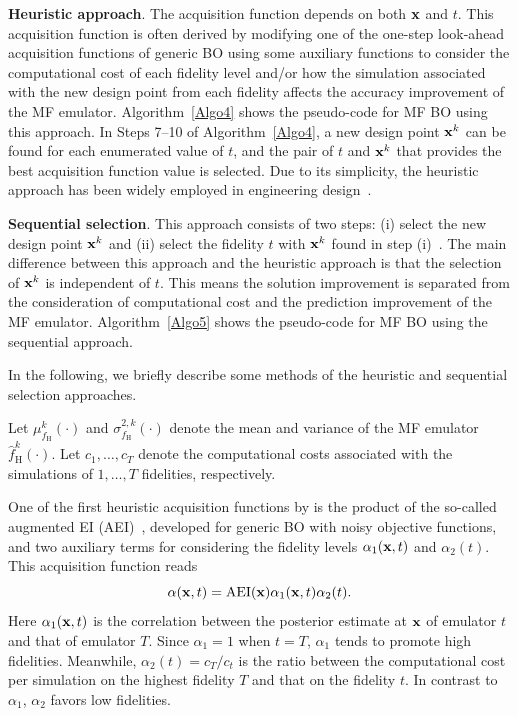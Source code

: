 \documentclass[iicol,sn-basic]{sn-jnl}%
\theoremstyle{thmstyleone}%
\theoremstyle{thmstyletwo}
\theoremstyle{thmstylethree}
\begin{document}
\begin{linenumbers}
\textbf{Heuristic approach}.
The acquisition function depends on both $\bf x$ and $t$.
This acquisition function is often derived by modifying one of the one-step look-ahead acquisition functions of generic BO using some auxiliary functions to consider the computational cost of each fidelity level and/or how the simulation associated with the new design point from each fidelity affects the accuracy improvement of the MF emulator.
Algorithm~\ref{Algo4} shows the pseudo-code for MF BO using this approach.
In Steps 7--10 of Algorithm~\ref{Algo4}, a new design point ${\bf x}^k$ can be found for each enumerated value of $t$, and the pair of $t$ and ${\bf x}^k$ that provides the best acquisition function value is selected.
Due to its simplicity, the heuristic approach has been widely employed in engineering design~\citep{Huang2006,Poloczek2017,YZhang2018,Ghoreishi2019,Ruan2020,Shu2021,Fiore2021,Sacher2021,He2021,Huang2023,Ribeiro2023,Winter2023,Foumani2023,Grassi2023,Fiore2023}.

\textbf{Sequential selection}.
This approach consists of two steps: (i) select the new design point ${\bf x}^k$ and (ii) select the fidelity $t$ with ${\bf x}^k$ found in step (i)~\citep{Chen2016,Kandasamy2017,Meliani2019,Tran2020a,Tran2020b,Kandasamy2019}.
The main difference between this approach and the heuristic approach is that the selection of ${\bf x}^k$ is independent of $t$.
This means the solution improvement is separated from the consideration of computational cost and the prediction improvement of the MF emulator.
Algorithm~\ref{Algo5} shows the pseudo-code for MF BO using the sequential approach. 

In the following, we briefly describe some methods of the heuristic and sequential selection approaches.

Let $\mu^k_{f_\text{H}}(\cdot)$ and $\sigma_{f_\text{H}}^{2,k}(\cdot)$ denote the mean and variance of the MF emulator $\hat{f}_\text{H}^k(\cdot)$.
Let $c_1,\dots,c_T$ denote the computational costs associated with the simulations of $1,\dots,T$ fidelities, respectively.

One of the first heuristic acquisition functions by \cite{Huang2006} is the product of the so-called augmented EI (AEI)~\citep{Huang2006a}, developed for generic BO with noisy objective functions, and two auxiliary terms for considering the fidelity levels $\alpha_1({\bf x},t)$ and $\alpha_2(t)$.
This acquisition function reads
\begin{equation}
		\alpha({\bf x},t) = \text{AEI}({\bf x}) \alpha_1({\bf x},t) \alpha_2(t).
\end{equation}
Here $\alpha_1({\bf x},t)$ is the correlation between the posterior estimate at $\bf x$ of emulator $t$ and that of emulator $T$.
Since $\alpha_1 = 1$ when $t=T$, $\alpha_1$ tends to promote high fidelities. 
Meanwhile, $\alpha_2(t) = c_T/c_t$ is the ratio between the computational cost per simulation on the highest fidelity $T$ and that on the fidelity $t$.
In contrast to $\alpha_1$, $\alpha_2$ favors low fidelities.


\end{linenumbers}
\end{document}

